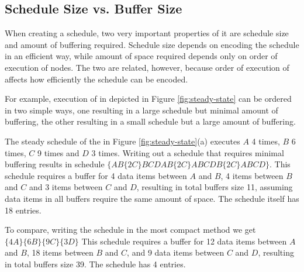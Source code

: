 \subsection{Schedule Size vs. Buffer Size}
\label{sec:sched-vs-buffer}

\begin{comment}
\begin{figure}
\begin{center}

\psfig{figure=pipeline-buffers.eps,width=0.6in} \caption[4 {\filter}
{\pipeline}]{Sample 4 {\filter} {\pipeline}.  This {\pipeline} is
the same as one in Figure \ref{fig:steady-state} (a), except that
its children do not peek extra data} \label{fig:pipeline-buffers}
\end{center}
\end{figure}
\end{comment}

When creating a schedule, two very important properties of it are
schedule size and amount of buffering required.  Schedule size
depends on encoding the schedule in an efficient way, while amount
of space required depends only on order of execution of nodes. The
two are related, however, because order of execution of {\filters}
affects how efficiently the schedule can be encoded.

For example, execution of {\filters} in {\pipeline} depicted in
Figure \ref{fig:steady-state} can be ordered in two simple ways,
one resulting in a large schedule but minimal amount of buffering,
the other resulting in a small schedule but a large amount of
buffering.

The steady schedule of the {\pipeline} in Figure
\ref{fig:steady-state}(a) executes {\filter} $A$ 4 times,
{\filter} $B$ 6 times, {\filter} $C$ 9 times and {\filter} $D$ 3
times. Writing out a schedule that requires minimal buffering
results in schedule $\{AB\{2C\}BCDAB\{2C\}ABCDB\{2C\}ABCD\}$. This
schedule requires a buffer for 4 data items between {\filters} $A$
and $B$, 4 items between $B$ and $C$ and 3 items between $C$ and
$D$, resulting in total buffers size 11, assuming data items in
all buffers require the same amount of space. The schedule itself
has 18 entries.

To compare, writing the schedule in the most compact method we get
$\{4A\}\{6B\}\{9C\}\{3D\}$  This schedule requires a buffer for 12
data items between {\filters} $A$ and $B$, 18 items between $B$
and $C$, and 9 data items between $C$ and $D$, resulting in total
buffers size 39.  The schedule has 4 entries.

